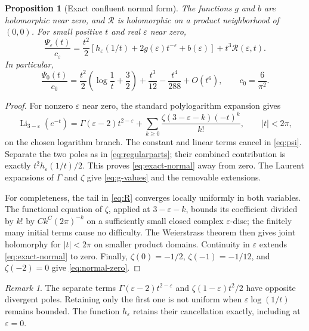 \documentclass[11pt,a4paper]{article}
\numberwithin{equation}{section}
\newtheorem{proposition}[theorem]{Proposition}
\theoremstyle{definition}
\theoremstyle{remark}
\newtheorem{remark}[theorem]{Remark}
\newcommand{\eps}{\varepsilon}
\newcommand{\cR}{\mathcal R}
\DeclareMathOperator{\Li}{Li}
\begin{document}
\begin{proposition}[Exact confluent normal form]
\label{prop:normal}
The functions \(g\) and \(b\) are holomorphic near zero, and \(\cR\) is
holomorphic on a product neighborhood of \((0,0)\). For small positive \(t\)
and real \(\eps\) near zero,
\begin{equation}
 \frac{\Psi_\eps(t)}{c_\eps}
 =\frac{t^2}{2}\left[h_\eps(1/t)+2g(\eps)t^{-\eps}+b(\eps)\right]
       +t^3\cR(\eps,t).
 \label{eq:exact-normal}
\end{equation}
In particular,
\begin{equation}
 \frac{\Psi_0(t)}{c_0}
 =\frac{t^2}{2}\left(\log\frac1t+\frac32\right)
   +\frac{t^3}{12}-\frac{t^4}{288}+O(t^6),
 \qquad c_0=\frac6{\pi^2}.
 \label{eq:normal-zero}
\end{equation}
\end{proposition}
\begin{proof}
For nonzero \(\eps\) near zero, the standard polylogarithm expansion
\cite[Eq.~25.12.12]{dlmf} gives
\[
 \Li_{3-\eps}(e^{-t})
 =\Gamma(\eps-2)t^{2-\eps}
  +\sum_{k\ge0}\frac{\zeta(3-\eps-k)(-t)^k}{k!},
 \qquad |t|<2\pi,
\]
on the chosen logarithm branch. The constant and linear terms cancel in
\eqref{eq:psi}. Separate the two poles as in \eqref{eq:regularparts}; their
combined contribution is exactly \(t^2h_\eps(1/t)/2\). This proves
\eqref{eq:exact-normal} away from zero. The Laurent expansions of \(\Gamma\)
and \(\zeta\) give \eqref{eq:g-values} and the removable extensions.

For completeness, the tail in \eqref{eq:R} converges locally uniformly in
both variables. The functional equation of \(\zeta\), applied at
\(3-\eps-k\), bounds its coefficient divided by \(k!\) by
\(C k^C(2\pi)^{-k}\) on a sufficiently small closed complex \(\eps\)-disc;
the finitely many initial terms cause no difficulty. The Weierstrass theorem
then gives joint holomorphy for \(|t|<2\pi\) on smaller product domains.
Continuity in \(\eps\) extends \eqref{eq:exact-normal} to zero. Finally,
\(\zeta(0)=-1/2\), \(\zeta(-1)=-1/12\), and \(\zeta(-2)=0\) give
\eqref{eq:normal-zero}.
\end{proof}

\begin{remark}
The separate terms \(\Gamma(\eps-2)t^{2-\eps}\) and
\(\zeta(1-\eps)t^2/2\) have opposite divergent poles. Retaining only the
first one is not uniform when \(\eps\log(1/t)\) remains bounded. The
function \(h_\eps\) retains their cancellation exactly, including at
\(\eps=0\).
\end{remark}
\end{document}
